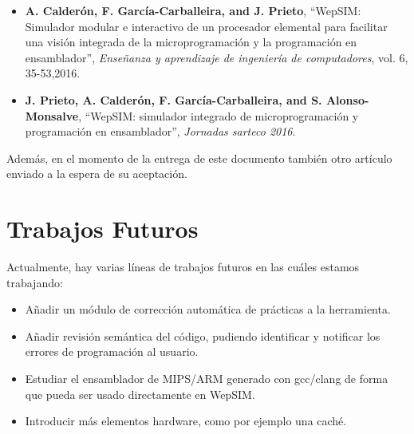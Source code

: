 \begin{itemize}

\item \textbf{A. Calderón, F. García-Carballeira, and J. Prieto}, “WepSIM: Simulador modular e interactivo de un procesador elemental para facilitar una visión integrada de la microprogramación y la programación en ensamblador”, \textit{Enseñanza y aprendizaje de ingeniería de computadores}, vol. 6, 35-53,2016. \cite{mateos2016wepsim}

\item \textbf{J. Prieto, A. Calderón, F. García-Carballeira, and S. Alonso-Monsalve}, “WepSIM: simulador integrado de microprogramación y programación en ensamblador”, \textit{Jornadas sarteco 2016}. \cite{arcos2032}

\end{itemize}

Además, en el momento de la entrega de este documento también otro artículo enviado a la espera de su aceptación.

\section{Trabajos Futuros}

Actualmente, hay varias líneas de trabajos futuros en las cuáles estamos trabajando:

\begin{itemize}

\item Añadir un módulo de corrección automática de prácticas a la herramienta.

\item Añadir revisión semántica del código, pudiendo identificar y notificar los errores de programación al usuario.

\item Estudiar el ensamblador de MIPS/ARM generado con gcc/clang de forma que pueda ser usado directamente en WepSIM.

\item Introducir más elementos hardware, como por ejemplo una caché.

\end{itemize}
